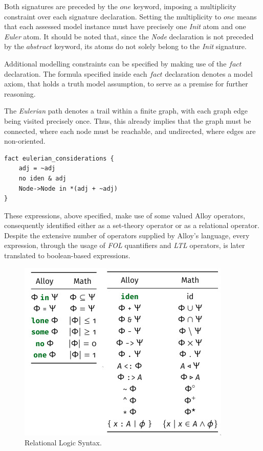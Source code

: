 Both signatures are preceded by the $one$ keyword, imposing a multiplicity constraint over each signature declaration. Setting the multiplicity to $one$ means that each assessed model instance must have precisely one \textit{Init} atom and one \textit{Euler} atom. It should be noted that, since the \textit{Node} declaration is not preceded by the $abstract$ keyword, its atoms do not solely belong to the \textit{Init} signature. 

Additional modelling constraints can be specified by making use of the $fact$ declaration. The formula specified inside each $fact$ declaration denotes a model axiom, that holds a truth model assumption, to serve as a premise for further reasoning. 

The \textit{Eulerian} path denotes a trail within a finite graph, with each graph edge being visited precisely once. Thus, this already implies that the graph must be connected, where each node must be reachable, and undirected, where edges are non-oriented.

\begin{lstlisting}[title={Graph restrictions through $fact$ declaration.}, otherkeywords = {abstract, sig, module, set, fact, iden, no, in, \=, \*, \+, \~, \-\>, \&}, floatplacement=H]
fact eulerian_considerations {
    adj = ~adj
    no iden & adj
    Node->Node in *(adj + ~adj)
}
\end{lstlisting}

These expressions, above specified, make use of some valued Alloy operators, consequently identified either as a set-theory operator or as a relational operator. Despite the extensive number of operators supplied by Alloy's language, every expression, through the usage of \textit{FOL} quantifiers and \textit{LTL} operators, is later translated to boolean-based expressions. 

\begin{figure}[H]
    \centering
    \includegraphics[width=0.5\linewidth]{images/alloy_relational_logic.jpg}
    \caption{Relational Logic Syntax.}
    \label{fig:alloy-rel}
\end{figure}

